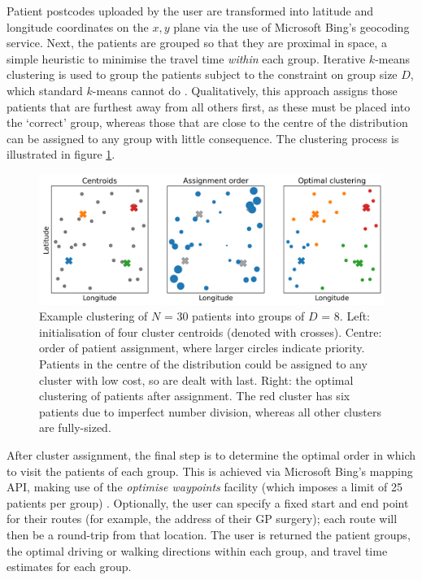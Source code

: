 \documentclass[review]{elsarticle}
\begin{document}
Patient postcodes uploaded by the user are transformed into latitude and longitude coordinates on the $x,y$ plane via the use of Microsoft Bing's geocoding service. Next, the patients are grouped so that they are proximal in space, a simple heuristic to minimise the travel time \textit{within} each group. Iterative $k$-means clustering is used to group the patients subject to the constraint on group size $D$, which standard $k$-means cannot do \cite{macqueen1967some, davidson2005clustering}. Qualitatively, this approach assigns those patients that are furthest away from all others first, as these must be placed into the `correct' group, whereas those that are close to the centre of the distribution can be assigned to any group with little consequence. The clustering process is illustrated in figure \ref{clustering}. 

\begin{figure}[H]
\centering
\includegraphics[width=\textwidth]{clustering_demo.png}
\caption{Example clustering of $N$ = 30 patients into groups of $D$ = 8. Left: initialisation of four cluster centroids (denoted with crosses). Centre: order of patient assignment, where larger circles indicate priority. Patients in the centre of the distribution could be assigned to any cluster with low cost, so are dealt with last. Right: the optimal clustering of patients after assignment. The red cluster has six patients due to imperfect number division, whereas all other clusters are fully-sized.}
\label{clustering}
\end{figure}

After cluster assignment, the final step is to determine the optimal order in which to visit the patients of each group. This is achieved via Microsoft Bing’s mapping API, making use of the \textit{optimise waypoints} facility (which imposes a limit of 25 patients per group) \cite{msbing}. Optionally, the user can specify a fixed start and end point for their routes (for example, the address of their GP surgery); each route will then be a round-trip from that location. The user is returned the patient groups, the optimal driving or walking directions within each group, and travel time estimates for each group. 
\end{document}
